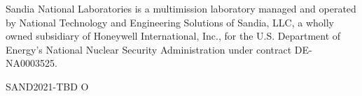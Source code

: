 \documentclass[letterpaper]{scrartcl}
\begin{document}
\vspace*{\fill}
\noindent
Sandia National Laboratories is a multimission laboratory managed and
operated by National Technology and Engineering Solutions of Sandia,
LLC, a wholly owned subsidiary of Honeywell International, Inc., for
the U.S. Department of Energy's National Nuclear Security
Administration under contract DE-NA0003525.

SAND2021-TBD O
\end{document}

